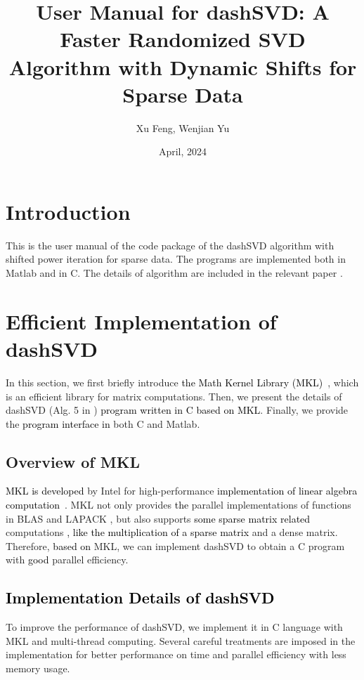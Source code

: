 \documentclass{ol-softwaremanual}
\title{User Manual for dashSVD: A Faster Randomized SVD Algorithm with Dynamic Shifts for Sparse Data}
\author{Xu Feng, Wenjian Yu}
\date{April, 2024}
\newcommand{\atn}[1]{\textcolor{black}{#1}}
\newcommand{\atnn}[1]{\textcolor{black}{#1}}
\begin{document}
\maketitle

\tableofcontents
\newpage

\section{Introduction}
This is the user manual of the code package of the dashSVD algorithm with shifted power iteration for sparse data. The programs are implemented both in Matlab and in C. The details of algorithm are included in the relevant paper \cite{dashSVD}.

\section{Efficient Implementation of dashSVD}
In this section, we first briefly introduce \atnn{the Math Kernel Library (MKL)}~\cite{Intel}, which is an efficient library for matrix computations.
Then, we present the details of dashSVD (Alg. 5 in \cite{dashSVD}) \atnn{program written in C based on MKL}. Finally, we provide the \atnn{program interface in} both C and Matlab.

\subsection{Overview of MKL}

\atnn{MKL is developed} by Intel for high-performance \atnn{implementation of linear algebra computation}~\cite{Intel}. MKL not only provides \atnn{the} parallel implementations {of functions in BLAS \cite{BLAS} and LAPACK \cite{LAPACK}}, 
but also supports \atnn{some sparse matrix related} computations \atnn{, like the multiplication of a sparse matrix} and a dense matrix. Therefore, \atn{based on} MKL, we can implement dashSVD to obtain a C program with \atnn{good} parallel efficiency. 

\subsection{\atnn{Implementation Details of dashSVD}}
To improve the performance of dashSVD, we implement it in C language with MKL and multi-thread computing. Several careful treatments are imposed in the implementation for better performance on time and parallel efficiency with less memory usage. 
\end{document}
